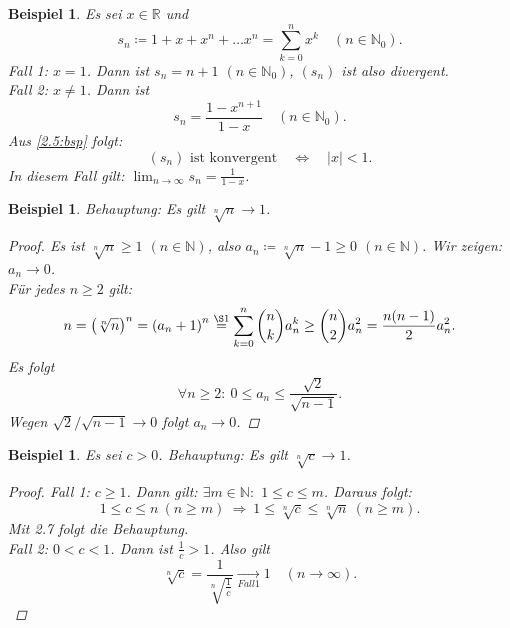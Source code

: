 \documentclass[12pt]{extreport} %
\newcommand{\N}{\mathbb{N}}
\newcommand{\R}{\mathbb{R}}
\theoremstyle{named}
\theoremstyle{itshape}
\theoremstyle{normal}
\newtheorem{beispiel}[unnamedtheorem]{Beispiel}
\begin{document}
\begin{beispiel} \label{2.6:bsp}
	Es sei $x \in \R$ und 
	$$s_{n} \coloneqq 1 + x + x^{n} + \dotsc x^{n} = \sum_{k = 0}^{n} x^{k} \quad (n \in \N_0).$$
	Fall 1: $x = 1$. Dann ist $s_{n} = n + 1$ $(n \in \N_0)$, $(s_{n})$ ist also divergent. \\
	Fall 2: $x \neq 1$. Dann ist  $$s_{n} = \frac{1 - x^{n+1}}{1 - x} \quad (n \in \N_0).$$
	Aus \ref{2.5:bsp} folgt:
	$$
		(s_{n}) \text{ ist konvergent} \quad \iff \quad |x| < 1.
	$$
	In diesem Fall gilt: $\lim_{n \to \infty} s_{n} = \frac{1}{1 - x}$.
\end{beispiel}


\begin{beispiel} \label{2.7:bsp}
	Behauptung: Es gilt $\sqrt[n]{n} \rightarrow 1$.
	
	\begin{proof}
		Es ist $\sqrt[n]{n} \geq 1$ $(n \in \N)$, also $a_{n} \coloneqq \sqrt[n]{n} - 1 \geq 0$ $(n \in \N)$. Wir zeigen: $a_{n} \rightarrow 0$. \\
		Für jedes $n \geq 2$ gilt:
		$$
			n = \left( \sqrt[n]{n} \right)^{n} = \left( a_{n} + 1 \right)^{n} 
			\overset{\S 1}{=} \sum_{k=0}^{n} \binom{n}{k} a_{n}^{k} \geq \binom{n}{2} a_{n}^{2} = \frac{n(n-1)}{2} a_{n}^{2}.
		$$
		Es folgt 
		$$\forall n\ge 2: ~ 0 \leq a_{n} \leq \frac{\sqrt{2}}{\sqrt{n-1}}.$$ Wegen $\sqrt{2}/\sqrt{n-1} \to 0$ folgt $a_{n} \rightarrow 0$.
	\end{proof}
\end{beispiel}


\begin{beispiel} \label{2.8:bsp}
	Es sei $c > 0$. Behauptung: Es gilt $\sqrt[n]{c} \rightarrow 1$.
	
	\begin{proof}
		Fall 1: $c \geq 1$. Dann gilt: $\exists m \in \N:$ $1 \leq c \leq m$. Daraus folgt:
		$$ 1 \leq c \leq n ~ (n \geq m) ~ \Rightarrow ~ 1 \leq \sqrt[n]{c} \leq \sqrt[n]{n} ~ (n\geq m). $$
		Mit 2.7 folgt die Behauptung. \\
		Fall 2: $0 < c < 1$. Dann ist $\frac{1}{c} > 1$. Also gilt
		$$\sqrt[n]{c} = \frac{1}{\sqrt[n]{\frac{1}{c}}} \xrightarrow[Fall 1]{} 1  \quad (n \rightarrow \infty).$$ 
	\end{proof}
\end{beispiel}
\end{document}
